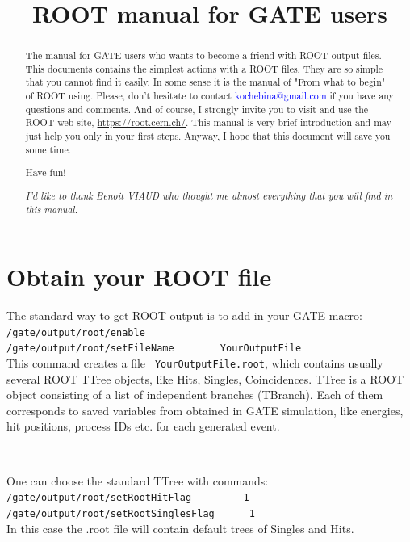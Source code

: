 \documentclass[12pt]{article}
\begin{document}



\title{ROOT manual for GATE users}
\tableofcontents
\newpage
\begin{abstract}
The manual for GATE users who wants to become a friend with ROOT output files. This documents contains the simplest actions with a ROOT files. They are so simple that you cannot find it easily. In some sense it is the manual of "From what to begin" of ROOT using.  Please, don't hesitate to contact \textcolor{blue}{kochebina@gmail.com} if you have any questions and comments. And of course, I strongly invite you to visit and use the ROOT web site, \href{https://root.cern.ch/}{https://root.cern.ch/}. This manual is very brief introduction and may just help you only in your first steps. Anyway, I hope that this document will save you some time.
\begin{center}
Have fun!
\end{center}
 

\vspace*{10cm}

\textit{I'd like to thank Benoit VIAUD who thought me almost everything that you will find in this manual.}   
\end{abstract}



\pagebreak


\section{Obtain your ROOT file}
The standard way to get ROOT output is to add in your GATE macro:
\\
\verb|/gate/output/root/enable | \\
\verb|/gate/output/root/setFileName        YourOutputFile|
\\
This command creates a file \verb| YourOutputFile.root|, which contains usually several ROOT TTree objects, like Hits, Singles, Coincidences. TTree  is a ROOT object consisting of a list of independent branches (TBranch). Each of them corresponds to saved variables from obtained in GATE simulation, like energies, hit positions, process IDs etc. for each generated event.  

\

One can choose the standard TTree with commands:\\
\verb|/gate/output/root/setRootHitFlag         1| \\
\verb|/gate/output/root/setRootSinglesFlag      1| \\
In this case the .root file will contain default trees of Singles and Hits.\\
 
\end{document}
